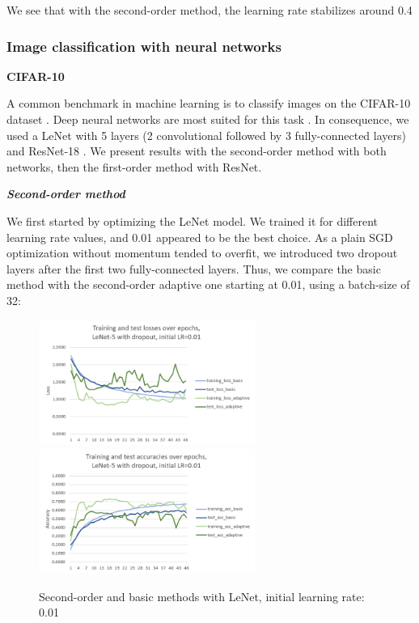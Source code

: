\documentclass{article}
\begin{document}
  We see that with the second-order method, the learning rate stabilizes around 0.4 

  \newpage
  \subsubsection{Image classification with neural networks}
  
  \textbf{CIFAR-10}
  
  A common benchmark in machine learning is to classify images on the CIFAR-10 dataset \cite{cifar}. Deep neural networks are most suited for this task \cite{krizhevsky2012imagenet}. In consequence, we used a LeNet with 5 layers (2 convolutional followed by 3 fully-connected layers) and ResNet-18 \cite{he2016deep}. We present results with the second-order method with both networks, then the first-order method with ResNet.
  
  \emph{\textbf{Second-order method}}
  
  We first started by optimizing the LeNet model. We trained it for different learning rate values, and 0.01 appeared to be the best choice. As a plain SGD optimization without momentum tended to overfit, we introduced two dropout layers after the first two fully-connected layers. Thus, we compare the basic method with the second-order adaptive one starting at 0.01, using a batch-size of 32:\\
  
  \begin{figure}[!h]
  	\includegraphics[width=200pt]{loss_lenet_d_0_01.png}
  	\includegraphics[width=200pt]{acc_lenet_d_0_01.png}
  	\caption{Second-order and basic methods with LeNet, initial learning rate: 0.01}
  \end{figure}
\end{document}
